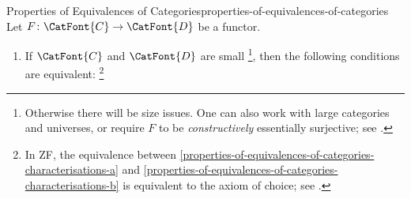 \begin{proposition}{Properties of Equivalences of Categories}{properties-of-equivalences-of-categories}%
    Let $F\colon\CatFont{C}\to\CatFont{D}$ be a functor.
    \begin{enumerate}
        \item\label{properties-of-equivalences-of-categories-characterisations}If $\CatFont{C}$ and $\CatFont{D}$ are small%
            \footnote{%
                Otherwise there will be size issues. One can also work with large categories and universes, or require $F$ to be \emph{constructively} essentially surjective; see \cite{MSE1465107}.
            }, %
            then the following conditions are equivalent:%
            \footnote{%
                In ZF, the equivalence between \cref{properties-of-equivalences-of-categories-characterisations-a} and \cref{properties-of-equivalences-of-categories-characterisations-b} is equivalent to the axiom of choice; see \cite{MO119454}.%

}
\end{enumerate}
\end{proposition}
